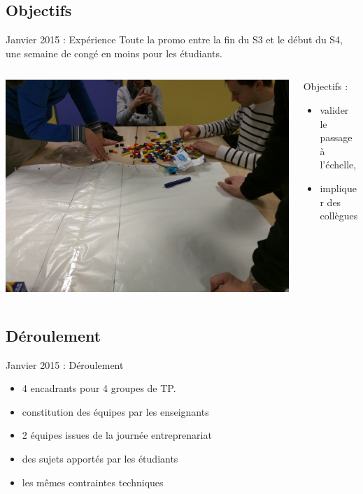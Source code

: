 \documentclass{beamer}
\begin{document}
\subsection{Objectifs}
\begin{frame}{Janvier 2015 : Expérience}
  Toute la promo entre la fin du S3 et le début du S4, une semaine de congé en moins pour les étudiants.
  \begin{columns}
    \begin{column}{0.5\textwidth}
      \begin{center}
        \includegraphics[width=\textwidth]{includes/201501_lego.jpg}      
      \end{center}
    \end{column}
    \begin{column}{0.5\textwidth}
      Objectifs : 
      \begin{itemize}
        \item valider le passage à l'échelle, 
        \item impliquer des collègues
      \end{itemize}
    \end{column}
  \end{columns}
\end{frame}

\subsection{Déroulement}
\begin{frame}{Janvier 2015 : Déroulement}
  \begin{itemize}
    \item 4 encadrants pour 4 groupes de TP.
    \item constitution des équipes par les enseignants
    \item 2 équipes issues de la journée entreprenariat
    \item des sujets apportés par les étudiants
    \item les mêmes contraintes techniques
  \end{itemize}
\end{frame}
\end{document}
